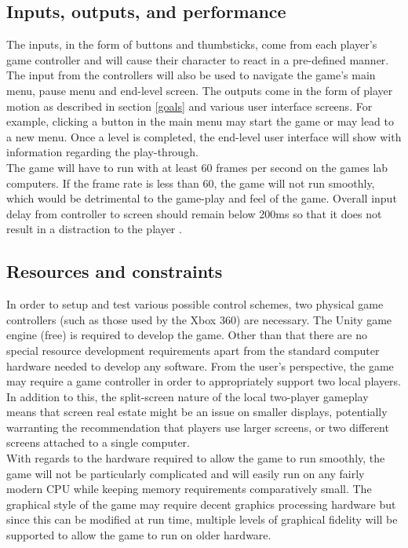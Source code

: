 \documentclass[a4paper,10pt]{article}
\begin{document}
\subsection{Inputs, outputs, and performance}
The inputs, in the form of buttons and thumbsticks, come from each player's game controller and will cause their character to react in a pre-defined manner. The input from the controllers will also be used to navigate the game's main menu, pause menu and end-level screen. The outputs come in the form of player motion as described in section \ref{goals} and various user interface screens. For example, clicking a button in the main menu may start the game or may lead to a new menu. Once a level is completed, the end-level user interface will show with information regarding the play-through.\smallskip\\The game will have to run with at least 60 frames per second on the games lab computers. If the frame rate is less than 60, the game will not run smoothly, which would be detrimental to the game-play and feel of the game. Overall input delay from controller to screen should remain below 200ms so that it does not result in a distraction to the player \cite{Leadbetter09}.

\subsection{Resources and constraints}
In order to setup and test various possible control schemes, two physical game controllers (such as those used by the Xbox 360) are necessary. The Unity game engine (free) is required to develop the game. Other than that there are no special resource development requirements apart from the standard computer hardware needed to develop any software. From the user's perspective, the game may require a game controller in order to appropriately support two local players. In addition to this, the split-screen nature of the local two-player gameplay means that screen real estate might be an issue on smaller displays, potentially warranting the recommendation that players use larger screens, or two different screens attached to a single computer.
\smallskip\\
With regards to the hardware required to allow the game to run smoothly, the game will not be particularly complicated and will easily run on any fairly modern CPU while keeping memory requirements comparatively small. The graphical style of the game may require decent graphics processing hardware but since this can be modified at run time, multiple levels of graphical fidelity will be supported to allow the game to run on older hardware.
\end{document}
